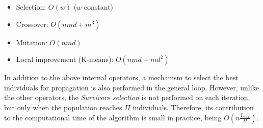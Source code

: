 

\begin{itemize}

	\item Selection: $O(w)$ ($w$ constant)

	\item Crossover: $O(nmd + m^{3})$

	\item Mutation: $O(nmd)$

	\item Local improvement (K-means): $O(nmd + md^2)$

\end{itemize}


In addition to the above internal operators, a mechanism to select the best individuals for propagation is also performed in the general loop. However, unlike the other operators, the \textit{Survivors selection} is not performed on each iteration, but only when the population reaches $\Pi$ individuals. Therefore, its contribution to the computational time of the algorithm is small in practice, being $O(n\frac{I_{max}}{\Pi})$.